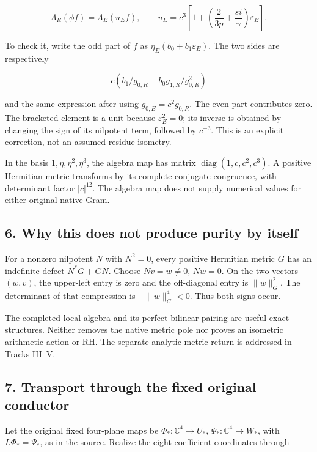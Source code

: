 \[
 \boxed{\Lambda_R(\phi f)=\Lambda_E(u_E f),\qquad
 u_E=c^3\left[1+\left(\frac2{3p}+\frac{s i}{\gamma}\right)\varepsilon_E\right].}
\]

To check it, write the odd part of \(f\) as
\(\eta_E(b_0+b_1\varepsilon_E)\). The two sides are respectively

\[
 c\left(b_1/g_{0,R}-b_0g_{1,R}/g_{0,R}^2\right)
\]

and the same expression after using \(g_{0,E}=c^2g_{0,R}\). The even
part contributes zero. The bracketed element is a unit because
\(\varepsilon_E^2=0\); its inverse is obtained by changing the sign of
its nilpotent term, followed by \(c^{-3}\). This is an explicit
correction, not an assumed residue isometry.

In the basis \(1,\eta,\eta^2,\eta^3\), the algebra map has matrix
\(\operatorname{diag}(1,c,c^2,c^3)\). A positive Hermitian metric
transforms by its complete conjugate congruence, with determinant factor
\(|c|^{12}\). The algebra map does not supply numerical values for
either original native Gram.

\subsection{6. Why this does not produce purity by
itself}\label{why-this-does-not-produce-purity-by-itself}

For a nonzero nilpotent \(N\) with \(N^2=0\), every positive Hermitian
metric \(G\) has an indefinite defect \(N^*G+GN\). Choose \(Nv=w\ne0\),
\(Nw=0\). On the two vectors \((w,v)\), the upper-left entry is zero and
the off-diagonal entry is \(\|w\|_G^2\). The determinant of that
compression is \(-\|w\|_G^4<0\). Thus both signs occur.

The completed local algebra and its perfect bilinear pairing are useful
exact structures. Neither removes the native metric pole nor proves an
isometric arithmetic action or RH. The separate analytic metric return
is addressed in Tracks III--V.

\subsection{7. Transport through the fixed original
conductor}\label{transport-through-the-fixed-original-conductor}

Let the original fixed four-plane maps be \(\Phi_*:\mathbb C^4\to U_*\),
\(\Psi_*:\mathbb C^4\to W_*\), with \(L\Phi_*=\Psi_*\), as in the
source. Realize the eight coefficient coordinates through

